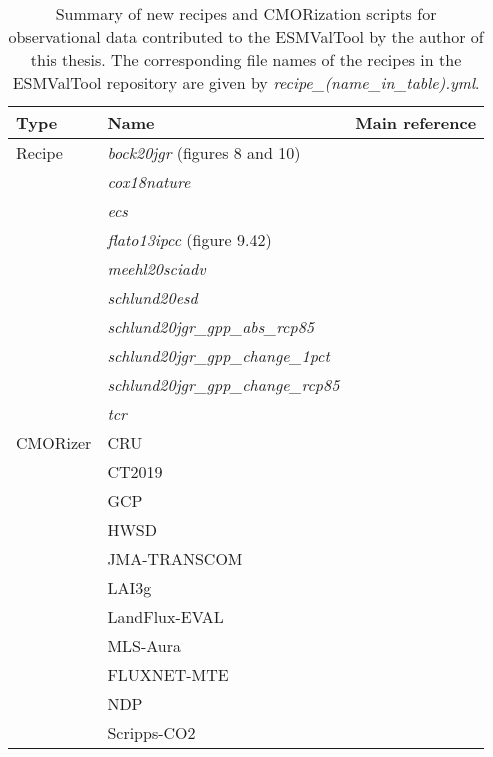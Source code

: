 \begin{table}[t]
  \centering
  \begin{tabulary}{\columnwidth}{L L L}
    \toprule
    Type & Name & Main reference \\
    \midrule
    Recipe & \emph{bock20jgr} (figures 8 and 10) & \autocite{Bock2020} \\
    & \emph{cox18nature} & \autocite{Cox2018} \\
    & \emph{ecs} & \autocite{Gregory2004} \\
    & \emph{flato13ipcc} (figure 9.42) & \autocite{Flato2013} \\
    & \emph{meehl20sciadv} & \autocite{Meehl2020} \\
    & \emph{schlund20esd} & \autocite{Schlund2020a} \\
    & \emph{schlund20jgr\_gpp\_abs\_rcp85} & \autocite{Schlund2020} \\
    & \emph{schlund20jgr\_gpp\_change\_1pct} & \autocite{Schlund2020} \\
    & \emph{schlund20jgr\_gpp\_change\_rcp85} & \autocite{Schlund2020} \\
    & \emph{tcr} & \autocite{Gregory2008} \\
    \midrule
    \acs{CMOR}izer & CRU & \autocite{Harris2014} \\
    & CT2019 & \autocite{Jacobson2020} \\
    & GCP & \autocite{Friedlingstein2020} \\
    & HWSD & \autocite{Wieder2014} \\
    & JMA-TRANSCOM & \autocite{Maki2010} \\
    & LAI3g & \autocite{Zhu2013} \\
    & LandFlux-EVAL & \autocite{Mueller2013} \\
    & MLS-Aura & \autocite{Read2015} \\
    & FLUXNET-MTE & \autocite{Jung2011} \\
    & NDP & \autocite{Gibbs2006} \\
    & Scripps-\acs{CO2} & \autocite{Keeling2005} \\
    \bottomrule
  \end{tabulary}
  \caption[
    Summary of new recipes and \acs{CMOR}ization scripts for observational data
    contributed to the \acf{ESMValTool} by the author of this thesis.
  ]{
    Summary of new recipes and \acs{CMOR}ization scripts for observational data
    contributed to the \acf{ESMValTool} by the author of this thesis. The
    corresponding file names of the recipes in the \acs{ESMValTool} repository
    are given by \emph{recipe\_(name\_in\_table).yml}.
  }
  \label{tab:03:changes_to_esmvaltool}
\end{table}

